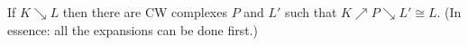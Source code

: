 If $K \searrow L$ then there are CW complexes $P$ and $L'$ such that $K \nearrow P \searrow L' \cong L$. (In essence: all the expansions can be done first.)
